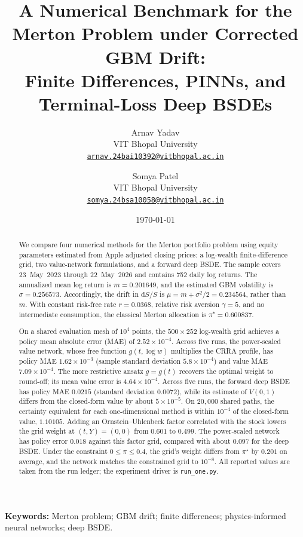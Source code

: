 \documentclass[11pt,a4paper]{article}
\title{A Numerical Benchmark for the Merton Problem under Corrected GBM Drift: \\Finite Differences, PINNs, and Terminal-Loss Deep BSDEs}
\author{
Arnav Yadav\\
{\small VIT Bhopal University}\\
{\small \href{mailto:arnav.24bai10392@vitbhopal.ac.in}{\texttt{arnav.24bai10392@vitbhopal.ac.in}}}
\and
Somya Patel\\
{\small VIT Bhopal University}\\
{\small \href{mailto:somya.24bsa10058@vitbhopal.ac.in}{\texttt{somya.24bsa10058@vitbhopal.ac.in}}}
}
\date{\today}
\begin{document}
\maketitle

\begin{abstract}
We compare four numerical methods for the Merton portfolio problem using equity parameters estimated from Apple adjusted closing prices: a log-wealth finite-difference grid, two value-network formulations, and a forward deep BSDE. The sample covers 23~May~2023 through 22~May~2026 and contains 752 daily log returns. The annualized mean log return is $m=0.201649$, and the estimated GBM volatility is $\sigma=0.256573$. Accordingly, the drift in $\mathrm dS/S$ is $\mu=m+\sigma^2/2=0.234564$, rather than $m$. With constant risk-free rate $r=0.0368$, relative risk aversion $\gamma=5$, and no intermediate consumption, the classical Merton allocation is $\pi^{\star}=0.600837$.

On a shared evaluation mesh of $10^{4}$ points, the $500\times 252$ log-wealth grid achieves a policy mean absolute error (MAE) of $2.52\times 10^{-4}$. Across five runs, the power-scaled value network, whose free function $g(t,\log w)$ multiplies the CRRA profile, has policy MAE $1.62\times 10^{-3}$ (sample standard deviation $5.8\times 10^{-4}$) and value MAE $7.09\times 10^{-4}$. The more restrictive ansatz $g=g(t)$ recovers the optimal weight to round-off; its mean value error is $4.64\times 10^{-4}$. Across five runs, the forward deep BSDE has policy MAE $0.0215$ (standard deviation $0.0072$), while its estimate of $V(0,1)$ differs from the closed-form value by about $5\times 10^{-5}$. On $20{,}000$ shared paths, the certainty equivalent for each one-dimensional method is within $10^{-4}$ of the closed-form value, $1.10105$. Adding an Ornstein--Uhlenbeck factor correlated with the stock lowers the grid weight at $(t,Y)=(0,0)$ from $0.601$ to $0.499$. The power-scaled network has policy error $0.018$ against this factor grid, compared with about $0.097$ for the deep BSDE. Under the constraint $0\le\pi\le0.4$, the grid's weight differs from $\pi^{\star}$ by $0.201$ on average, and the network matches the constrained grid to $10^{-8}$. All reported values are taken from the run ledger; the experiment driver is \texttt{run\_one.py}.
\end{abstract}

\noindent\textbf{Keywords:} Merton problem; GBM drift; finite differences; physics-informed neural networks; deep BSDE.
\end{document}
